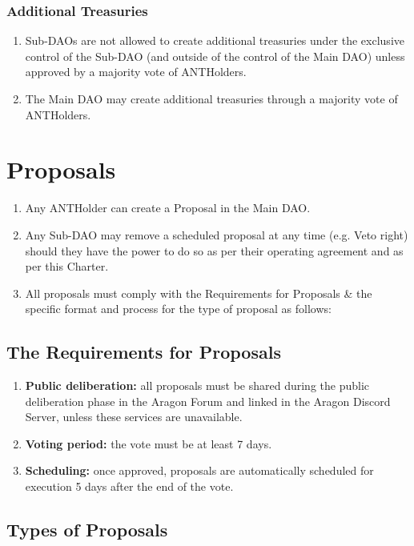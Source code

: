 \subsubsection*{Additional Treasuries}
\begin{enumerate}
	\item Sub-\acp{DAO} are not allowed to create additional treasuries under the exclusive control of the Sub-\ac{DAO} (and outside of the control of the Main \ac{DAO}) unless approved by a majority vote of \glspl{ANTHolder}.
	\item The Main \ac{DAO} may create additional treasuries through a majority vote of \glspl{ANTHolder}.
\end{enumerate}  


\section{Proposals}

\begin{enumerate}
	\item Any \ac{ANTHolder} can create a Proposal in the Main \ac{DAO}.
	\item Any Sub-\ac{DAO} may remove a scheduled proposal at any time (e.g. Veto right) should they have the power to do so as per their operating agreement and as per this Charter.
	\item All proposals must comply with the Requirements for Proposals \& the specific format and process for the type of proposal as follows:
\end{enumerate}

\subsection{The Requirements for Proposals}

\begin{enumerate}
	\item \textbf{Public deliberation:} all proposals must be shared during the public deliberation phase in the Aragon Forum and linked in the Aragon Discord Server, unless these services are unavailable.
	\item \textbf{Voting period:} the vote must be at least 7 days.
	\item \textbf{Scheduling:} once approved, proposals are automatically scheduled for execution 5 days after the end of the vote.
\end{enumerate}


\subsection{Types of Proposals}

